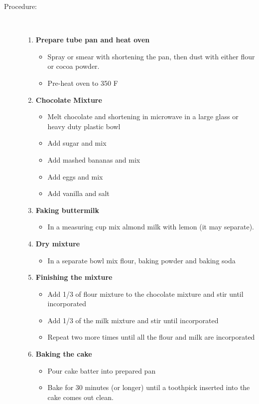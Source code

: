 \documentclass[11pt,letterpaper]{article}
\begin{document}
\begin{description}
\item[Procedure:]\ \\
	\begin{enumerate}
	\item {\bf Prepare tube pan and heat oven}
	\begin{itemize}
	\item Spray or smear with shortening the pan, then dust with either flour or cocoa powder.
	\item Pre-heat oven to 350 F
	 \end{itemize}
	\item {\bf Chocolate Mixture}
	\begin{itemize}
	\item Melt chocolate and shortening in microwave in a large glass or heavy duty plastic bowl
	 \item Add sugar and mix
	 \item Add mashed bananas and mix
	 \item Add eggs and mix
	 \item Add vanilla and salt
	\end{itemize}
	\item {\bf Faking buttermilk}
	\begin{itemize}
        		\item In a measuring cup mix almond milk with lemon (it may separate).
	\end{itemize}
	\item {\bf Dry mixture}
	\begin{itemize}
	\item In a separate bowl mix flour, baking powder and baking soda
       	\end{itemize}
	\item {\bf Finishing the mixture}
	\begin{itemize}
        \item Add 1/3 of flour mixture to the chocolate mixture and stir until incorporated
        \item Add 1/3 of the milk mixture and stir until incorporated
        \item Repeat two more times until all the flour and milk are incorporated
        \end{itemize}
        \item {\bf Baking the cake}
	\begin{itemize}
        \item Pour cake batter into prepared pan
        \item Bake for 30 minutes (or longer) until a toothpick inserted into the cake comes out clean.

\end{itemize}
\end{enumerate}
\end{description}
\end{document}
